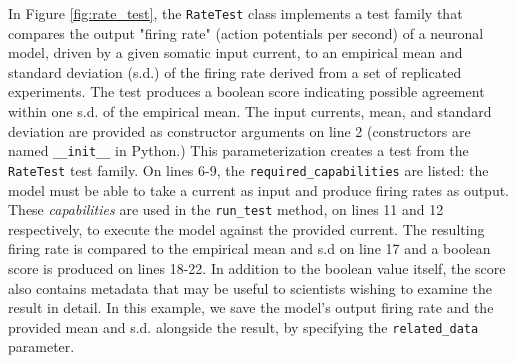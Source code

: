 \documentclass[11pt,letterpaper]{article}
\begin{document}
In Figure \ref{fig:rate_test}, the \verb|RateTest| class implements a test family that compares the output "firing rate" (action potentials per second) of a neuronal model, driven by a given somatic input current, to an empirical mean and standard deviation (s.d.) of the firing rate derived from a set of replicated experiments. The test produces a boolean score indicating possible agreement within one s.d. of the empirical mean. The input currents, mean, and standard deviation are provided as constructor arguments on line 2 (constructors are named \verb|__init__| in Python.) This parameterization creates a test from the \verb|RateTest| test family.  On lines 6-9, the \verb|required_capabilities| are listed: the model must be able to take a current as input and produce firing rates as output. These \textit{capabilities} are used in the \verb|run_test| method, on lines 11 and 12 respectively, to execute the model against the provided current. The resulting firing rate is compared to the empirical mean and s.d on line 17 and a boolean score is produced on lines 18-22. In addition to the boolean value itself, the score also contains metadata that may be useful to scientists wishing to examine the result in detail. In this example, we save the model's output firing rate and the provided mean and s.d. alongside the result, by specifying the \verb|related_data| parameter.
\end{document}

